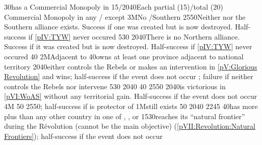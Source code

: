 %
%
%
{}{30}{\paysmajeurFrance has a Commercial Monopoly in }%
%
%
%
{15/20}{40}{Each partial (15)/total (20) Commercial Monopoly in any \STZ/\CTZ
  except }%
%
%
\EUobjective3M{No \GE/Southern \HRE}{}%
{25}{50}{Neither \GE nor the Southern \HRE alliance exists. Success if one was
  created but is now destroyed. Half-success if \ref{pIV:TYW} never occured}%
%
%
{5}{30}{\EU@objEachCOL}%
%
%
{20}{40}{There is no Northern \HRE alliance. Success if it was created but is
  now destroyed. Half-success if \ref{pIV:TYW} never occured}%
%
%
%
{}{40}{}%
%
\EUobjective2M{Adjacent to \HOL}{}%
{}{40}{\paysmajeurFrance owns at least one province adjacent to
  \paysmajeurHollande national territory}%
%
%
{20}{40}{\paysmajeurFrance either controls the Rebels or makes an intervention
  in \ref{pV:Glorious Revolution} and wins; half-success if the event does not
  occur ; failure if \paysmajeurFrance neither controls the Rebels nor
  intervene}%
%
%
{5}{30}{}%
%
%
{20}{40}{}%
%
%
%
{}{40}{}%
%
%
{25}{50}{\EU@objWoSS}%
%
%
{20}{40}{\paysmajeurFrance is victorious in \ref{pVI:WoAS} without any
  territorial gain. Half-success if the event does not occur}%
%
\EUobjective4M{}{}%
{}{50}{}%
%
%
{25}{50}{\EU@objPOLVictory; half-success if \paysmajeurSuede is protector of
  \paysPologne}%
%
%
\EUobjective1M{\payspologne still exists}{}%
{}{50}{}%
%
%
{20}{40}{\EU@objEachCC}%
%
%
{22}{45}{\EU@objIndependanceWars}%
%
%
{}{40}{\paysmajeurFrance has more \TP plus \COL than any other country in
  one of , , or
  }%
%
%
%
{15}{30}{\paysmajeurFrance reaches its ``natural frontier'' during the
  Révolution (cannot be the main objective) (\ref{pVII:Revolution:Natural
    Frontiers}); half-success if the event does not occur}%
